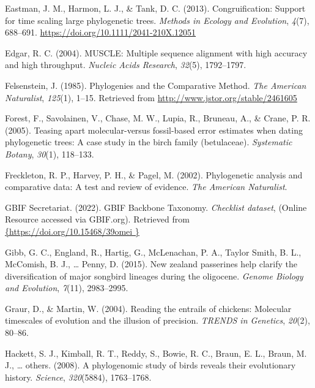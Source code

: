 \documentclass[english,man]{apa6}
\begin{document}
\leavevmode\hypertarget{ref-Eastman2013}{}%
Eastman, J. M., Harmon, L. J., \& Tank, D. C. (2013). Congruification: Support for time scaling large phylogenetic trees. \emph{Methods in Ecology and Evolution}, \emph{4}(7), 688--691. \url{https://doi.org/10.1111/2041-210X.12051}

\leavevmode\hypertarget{ref-edgar2004muscle}{}%
Edgar, R. C. (2004). MUSCLE: Multiple sequence alignment with high accuracy and high throughput. \emph{Nucleic Acids Research}, \emph{32}(5), 1792--1797.

\leavevmode\hypertarget{ref-Felsenstein1985a}{}%
Felsenstein, J. (1985). Phylogenies and the Comparative Method. \emph{The American Naturalist}, \emph{125}(1), 1--15. Retrieved from \url{http://www.jstor.org/stable/2461605}

\leavevmode\hypertarget{ref-forest2005teasing}{}%
Forest, F., Savolainen, V., Chase, M. W., Lupia, R., Bruneau, A., \& Crane, P. R. (2005). Teasing apart molecular-versus fossil-based error estimates when dating phylogenetic trees: A case study in the birch family (betulaceae). \emph{Systematic Botany}, \emph{30}(1), 118--133.

\leavevmode\hypertarget{ref-freckleton2002phylogenetic}{}%
Freckleton, R. P., Harvey, P. H., \& Pagel, M. (2002). Phylogenetic analysis and comparative data: A test and review of evidence. \emph{The American Naturalist}.

\leavevmode\hypertarget{ref-gbif2022taxonomy}{}%
GBIF Secretariat. (2022). GBIF Backbone Taxonomy. \emph{Checklist dataset}, (Online Resource accessed via GBIF.org). Retrieved from \href{\%7Bhttps://doi.org/10.15468/39omei\%20\%7D}{\{https://doi.org/10.15468/39omei \}}

\leavevmode\hypertarget{ref-gibb2015new}{}%
Gibb, G. C., England, R., Hartig, G., McLenachan, P. A., Taylor Smith, B. L., McComish, B. J., \ldots{} Penny, D. (2015). New zealand passerines help clarify the diversification of major songbird lineages during the oligocene. \emph{Genome Biology and Evolution}, \emph{7}(11), 2983--2995.

\leavevmode\hypertarget{ref-graur2004reading}{}%
Graur, D., \& Martin, W. (2004). Reading the entrails of chickens: Molecular timescales of evolution and the illusion of precision. \emph{TRENDS in Genetics}, \emph{20}(2), 80--86.

\leavevmode\hypertarget{ref-hackett2008phylogenomic}{}%
Hackett, S. J., Kimball, R. T., Reddy, S., Bowie, R. C., Braun, E. L., Braun, M. J., \ldots{} others. (2008). A phylogenomic study of birds reveals their evolutionary history. \emph{Science}, \emph{320}(5884), 1763--1768.
\end{document}
